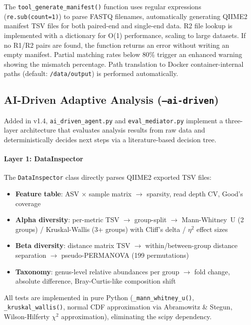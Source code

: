 \documentclass[12pt, a4paper]{article}
\begin{document}
The \texttt{tool\_generate\_manifest()} function uses regular expressions
(\texttt{re.sub(count=1)}) to parse FASTQ filenames,
automatically generating QIIME2 manifest TSV files for both
paired-end and single-end data. R2 file lookup is implemented
with a dictionary for O(1) performance, scaling to large datasets.
If no R1/R2 pairs are found, the function returns an error
without writing an empty manifest. Partial matching rates below 80\%
trigger an enhanced warning showing the mismatch percentage.
Path translation to Docker container-internal paths
(default: \texttt{/data/output}) is performed automatically.

\subsection{AI-Driven Adaptive Analysis (\texttt{--ai-driven})}

Added in v1.4, \texttt{ai\_driven\_agent.py} and \texttt{eval\_mediator.py} implement
a three-layer architecture that evaluates analysis results from raw data and
deterministically decides next steps via a literature-based decision tree.

\paragraph{Layer 1: DataInspector}
The \texttt{DataInspector} class directly parses QIIME2 exported TSV files:
\begin{itemize}
  \item \textbf{Feature table}: ASV $\times$ sample matrix $\rightarrow$ sparsity, read depth CV, Good's coverage
  \item \textbf{Alpha diversity}: per-metric TSV $\rightarrow$ group-split $\rightarrow$ Mann-Whitney~U (2 groups) / Kruskal-Wallis (3+ groups) with Cliff's delta / $\eta^2$ effect sizes
  \item \textbf{Beta diversity}: distance matrix TSV $\rightarrow$ within/between-group distance separation $\rightarrow$ pseudo-PERMANOVA (199 permutations)
  \item \textbf{Taxonomy}: genus-level relative abundances per group $\rightarrow$ fold change, absolute difference, Bray-Curtis-like composition shift
\end{itemize}
All tests are implemented in pure Python (\texttt{\_mann\_whitney\_u()}, \texttt{\_kruskal\_wallis()},
normal CDF approximation via Abramowitz \& Stegun, Wilson-Hilferty $\chi^2$ approximation),
eliminating the scipy dependency.
\end{document}
